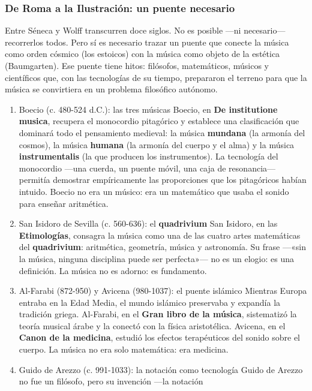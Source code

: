 \documentclass[14pt, a4paper]{article}
\begin{document}
\subsubsection{De Roma a la Ilustración: un puente necesario}
\label{puente-roma-ilustracion}
Entre Séneca y Wolff transcurren doce siglos. No es posible —ni
necesario— recorrerlos todos. Pero sí es necesario trazar un puente
que conecte la música como orden cósmico (los estoicos) con la música
como objeto de la estética (Baumgarten). Ese puente tiene hitos:
filósofos, matemáticos, músicos y científicos que, con las tecnologías
de su tiempo, prepararon el terreno para que la música se convirtiera
en un problema filosófico autónomo.
\begin{enumerate}
\item Boecio (c. 480-524 d.C.): las tres músicas
\label{boecio}
Boecio, en \textbf{De institutione musica}, recupera el monocordio pitagórico
y establece una clasificación que dominará todo el pensamiento
medieval: la música \textbf{mundana} (la armonía del cosmos), la música
\textbf{humana} (la armonía del cuerpo y el alma) y la música \textbf{instrumentalis}
(la que producen los instrumentos). La tecnología del monocordio
—una cuerda, un puente móvil, una caja de resonancia— permitía
demostrar empíricamente las proporciones que los pitagóricos habían
intuido. Boecio no era un músico: era un matemático que usaba el
sonido para enseñar aritmética.
\item San Isidoro de Sevilla (c. 560-636): el \textbf{quadrivium}
\label{isidoro-puente}
San Isidoro, en las \textbf{Etimologías}, consagra la música como una de las
cuatro artes matemáticas del \textbf{quadrivium}: aritmética, geometría,
música y astronomía. Su frase —«sin la música, ninguna disciplina
puede ser perfecta»— no es un elogio: es una definición. La música no
es adorno: es fundamento.
\item Al-Farabi (872-950) y Avicena (980-1037): el puente islámico
\label{farabi-avicena}
Mientras Europa entraba en la Edad Media, el mundo islámico preservaba
y expandía la tradición griega. Al-Farabi, en el \textbf{Gran libro de la
música}, sistematizó la teoría musical árabe y la conectó con la
física aristotélica. Avicena, en el \textbf{Canon de la medicina}, estudió
los efectos terapéuticos del sonido sobre el cuerpo. La música no era
solo matemática: era medicina.
\item Guido de Arezzo (c. 991-1033): la notación como tecnología
\label{guido-puente}
Guido de Arezzo no fue un filósofo, pero su invención —la notación

\end{enumerate}
\end{document}

